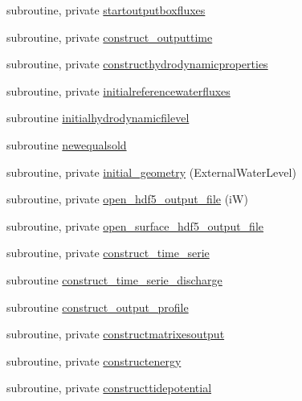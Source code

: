 \begin{DoxyCompactItemize}
subroutine, private \mbox{\hyperlink{namespacemodulehydrodynamic_ae7cd830108d9eacfb53fd458817db13d}{startoutputboxfluxes}}
\item 
subroutine, private \mbox{\hyperlink{namespacemodulehydrodynamic_aea0ceff2b860562b897884814ae392d9}{construct\+\_\+outputtime}}
\item 
subroutine, private \mbox{\hyperlink{namespacemodulehydrodynamic_af871717e205963c29069ba0ee23cd512}{constructhydrodynamicproperties}}
\item 
subroutine, private \mbox{\hyperlink{namespacemodulehydrodynamic_a6cc306a7b1d6e64156d2df83e7ea6550}{initialreferencewaterfluxes}}
\item 
subroutine \mbox{\hyperlink{namespacemodulehydrodynamic_acc95ab35ad823a54bc0cab6a88e60830}{initialhydrodynamicfilevel}}
\item 
subroutine \mbox{\hyperlink{namespacemodulehydrodynamic_a00b05bd1a14d5fd621b3b3ab3463568b}{newequalsold}}
\item 
subroutine, private \mbox{\hyperlink{namespacemodulehydrodynamic_aed12798a19237f32da3dbf20b90a6e41}{initial\+\_\+geometry}} (External\+Water\+Level)
\item 
subroutine, private \mbox{\hyperlink{namespacemodulehydrodynamic_a381b9a6e56cf40fbb60e681f7874c983}{open\+\_\+hdf5\+\_\+output\+\_\+file}} (iW)
\item 
subroutine, private \mbox{\hyperlink{namespacemodulehydrodynamic_a8cd8ea126b12cb779766bcdbe905b6b0}{open\+\_\+surface\+\_\+hdf5\+\_\+output\+\_\+file}}
\item 
subroutine, private \mbox{\hyperlink{namespacemodulehydrodynamic_a50ddc8a159376915f9ee9328f388d4fe}{construct\+\_\+time\+\_\+serie}}
\item 
subroutine \mbox{\hyperlink{namespacemodulehydrodynamic_ae0edf0b5ed199a732c27734b798443ab}{construct\+\_\+time\+\_\+serie\+\_\+discharge}}
\item 
subroutine \mbox{\hyperlink{namespacemodulehydrodynamic_aa3b8aa943159cc40b65537cff1888b6e}{construct\+\_\+output\+\_\+profile}}
\item 
subroutine, private \mbox{\hyperlink{namespacemodulehydrodynamic_a40ae80918927a7eb25c954cec3bd2b40}{constructmatrixesoutput}}
\item 
subroutine, private \mbox{\hyperlink{namespacemodulehydrodynamic_a048299b4cfb1c4c013ad653ff9e85f70}{constructenergy}}
\item 
subroutine, private \mbox{\hyperlink{namespacemodulehydrodynamic_a2a52e863aeb7df55203e4f6646d9b4a5}{constructtidepotential}}

\end{DoxyCompactItemize}
